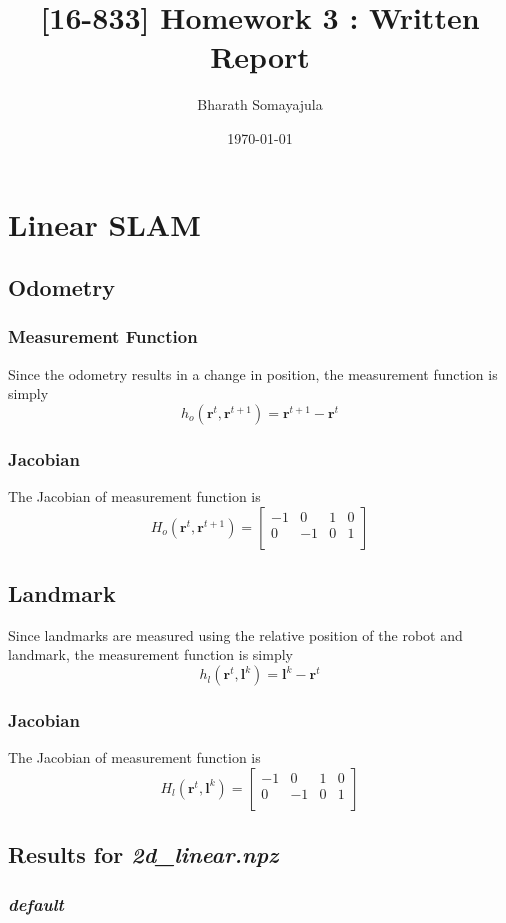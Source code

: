 \documentclass[12pt, a4paper]{article}
\title{[16-833] Homework 3 : Written Report}
\author{Bharath Somayajula}
\date{\today}
\begin{document}
\maketitle

\tableofcontents
\section{Linear SLAM}
\subsection{Odometry}
\subsubsection{Measurement Function}
Since the odometry results in a change in position, the measurement function is simply
\[h_o(\mathbf{r}^t, \mathbf{r}^{t+1}) = \mathbf{r}^{t+1} - \mathbf{r}^t\]
\subsubsection{Jacobian}
The Jacobian of measurement function is
\[H_o(\mathbf{r}^t, \mathbf{r}^{t+1}) = \begin{bmatrix}
  -1 & 0 & 1 & 0\\
  0 & -1 & 0 & 1\\
\end{bmatrix}\]
\subsection{Landmark}
Since landmarks are measured using the relative position of the robot and landmark, the measurement function is simply
\[h_l(\mathbf{r}^t, \mathbf{l}^{k}) = \mathbf{l}^{k} - \mathbf{r}^t\]
\subsubsection{Jacobian}
The Jacobian of measurement function is
\[H_l(\mathbf{r}^t, \mathbf{l}^{k}) = \begin{bmatrix}
  -1 & 0 & 1 & 0\\
  0 & -1 & 0 & 1\\
\end{bmatrix}\]
\subsection{Results for \textit{2d\_linear.npz}}
\subsubsection{\textit{default}}
\end{document}
